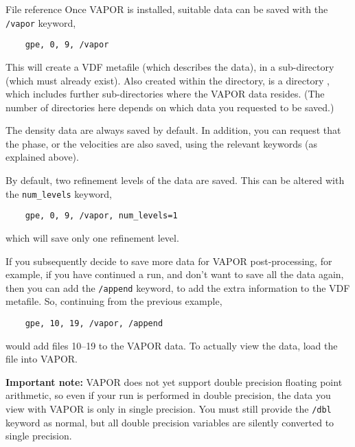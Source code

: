 \begin{chapter}{\label{cha:file_reference}File reference}
  Once VAPOR is installed, suitable data can be saved with the \verb"/vapor"
  keyword, \eg
  \begin{Verbatim}
    gpe, 0, 9, /vapor
  \end{Verbatim}
  This will create a  VDF metafile (which describes the data),
  in a sub-directory  (which must already exist).  Also created
  within the  directory, is a directory ,
  which includes further sub-directories where the VAPOR data resides.  (The
  number of directories here depends on which data you requested to be saved.)

  The density data are always saved by default.  In addition, you can request
  that the phase, or the velocities are also saved, using the relevant keywords
  (as explained above).

  By default, two refinement levels of the data are saved.  This can be altered
  with the \verb"num_levels" keyword, \eg
  \begin{Verbatim}
    gpe, 0, 9, /vapor, num_levels=1
  \end{Verbatim}
  which will save only one refinement level.

  If you subsequently decide to save more data for VAPOR post-processing, for
  example, if you have continued a run, and don't want to save all the data
  again, then you can add the \verb"/append" keyword, to add the extra
  information to the VDF metafile.  So, continuing from the previous example,
  \begin{Verbatim}
    gpe, 10, 19, /vapor, /append
  \end{Verbatim}
  would add files 10--19 to the VAPOR data.  To actually view the data, load the  file into VAPOR.

  \textbf{Important note:} VAPOR does not yet support double precision floating
  point arithmetic, so even if your run is performed in double precision, the
  data you view with VAPOR is only in single precision.  You must still provide
  the \verb"/dbl" keyword as normal, but all double precision variables are
  silently converted to single precision.

\end{chapter}
